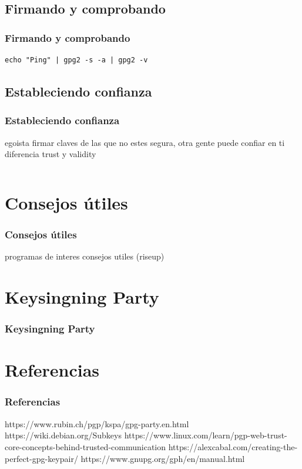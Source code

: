 \documentclass{beamer}
\begin{document}
\subsection{Firmando y comprobando}
\begin{frame}[fragile]
\frametitle{Firmando y comprobando}
\begin{lstlisting}
echo "Ping" | gpg2 -s -a | gpg2 -v
\end{lstlisting}
\end{frame}


\subsection{Estableciendo confianza}
\begin{frame}[fragile]
\frametitle{Estableciendo confianza}
egoista firmar claves de las que no estes segura, otra gente puede confiar
en ti
diferencia trust y validity
\begin{lstlisting}
\end{lstlisting}
\end{frame}


\section{Consejos útiles}
\begin{frame}
\frametitle{Consejos útiles}
programas de interes
consejos utiles (riseup)
\end{frame}


\section{Keysingning Party}
\begin{frame}
\frametitle{Keysingning Party}
\end{frame}


\section{Referencias}
\begin{frame}
\frametitle{Referencias}
https://www.rubin.ch/pgp/kspa/gpg-party.en.html
https://wiki.debian.org/Subkeys
https://www.linux.com/learn/pgp-web-trust-core-concepts-behind-trusted-communication
https://alexcabal.com/creating-the-perfect-gpg-keypair/
https://www.gnupg.org/gph/en/manual.html
\end{frame}
\end{document}
